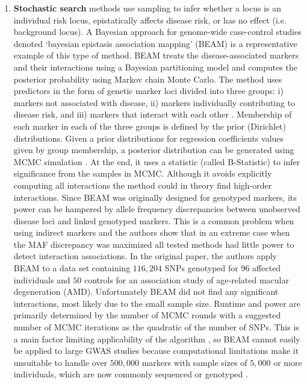 \begin{enumerate}
	\item \textbf{Stochastic search} methods use sampling to infer whether a locus is an individual risk locus, epistatically affects disease risk, or has no effect (i.e. background locus).
A Bayesian approach for genome-wide case-control studies denoted `bayesian epistasis association mapping' (BEAM) \cite{zhang2007bayesian} is a representative example of this type of method.
BEAM treats the disease-associated markers and their interactions using a Bayesian partitioning model and computes the posterior probability using Markov chain Monte Carlo.
The method uses predictors in the form of genetic marker loci divided into three groups: 
i) markers not associated with disease, 
ii) markers individually contributing to disease risk, and 
iii) markers that interact with each other \cite{zhang2007bayesian}.
Membership of each marker in each of the three groups is defined by the prior (Dirichlet) distributions.
Given a prior distributions for regression coefficients values given by group membership, a posterior distribution can be generated using MCMC simulation \cite{cordell2009detecting}.
At the end, it uses a statistic (called B-Statistic) to infer significance from the samples in MCMC. 
Although it avoids explicitly computing all interactions the method could in theory find high-order interactions. 
Since BEAM was originally designed for genotyped markers, its power can be hampered by allele frequency discrepancies between unobserved disease loci and linked genotyped markers.
This is a common problem when using indirect markers and the authors show that in an extreme case when the MAF discrepancy was maximized all tested methods had little power to detect interaction associations.
In the original paper, the authors apply BEAM to a data set containing $116,204$ SNPs genotyped for $96$ affected individuals and $50$ controls for an association study of age-related macular degeneration (AMD).
Unfortunately BEAM did not find any significant interactions, most likely due to the small sample size.
Runtime and power are primarily determined by the number of MCMC rounds with a suggested number of MCMC iterations as the quadratic of the number of SNPs.
This is a main factor limiting applicability of the algorithm \cite{li2011detecting}, so BEAM cannot easily be applied to large GWAS studies because computational limitations make it unsuitable to handle over $500,000$ markers with sample sizes of $5,000$ or more individuals, which are now commonly sequenced or genotyped \cite{cordell2009detecting}.


\end{enumerate}
